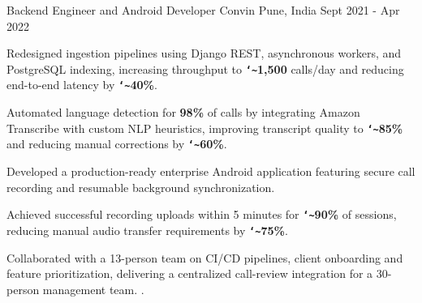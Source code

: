 \begin{cventries}
  \cventry
    {Backend Engineer and Android Developer} %
    {Convin} %
    {Pune, India} %
    {Sept 2021 - Apr 2022} %
    {
      \begin{cvitems} %
        \item {Redesigned ingestion pipelines using Django REST, asynchronous workers, and PostgreSQL indexing, increasing throughput to \textbf{\texttt{\char`\~}1,500} calls/day and reducing end-to-end latency by \textbf{\texttt{\char`\~}40\%}.}
        \item {Automated language detection for \textbf{98\%} of calls by integrating Amazon Transcribe with custom NLP heuristics, improving transcript quality to \textbf{\texttt{\char`\~}85\%} and reducing manual corrections by \textbf{\texttt{\char`\~}60\%}.}
        \item {Developed a production-ready enterprise Android application featuring secure call recording and resumable background synchronization.}
        \item {Achieved successful recording uploads within 5 minutes for \textbf{\texttt{\char`\~}90\%} of sessions, reducing manual audio transfer requirements by \textbf{\texttt{\char`\~}75\%}.}
        \item {Collaborated with a 13-person team on CI/CD pipelines, client onboarding and feature prioritization, delivering a centralized call-review integration for a 30-person management team. .}
      \end{cvitems}
    }
\end{cventries}
